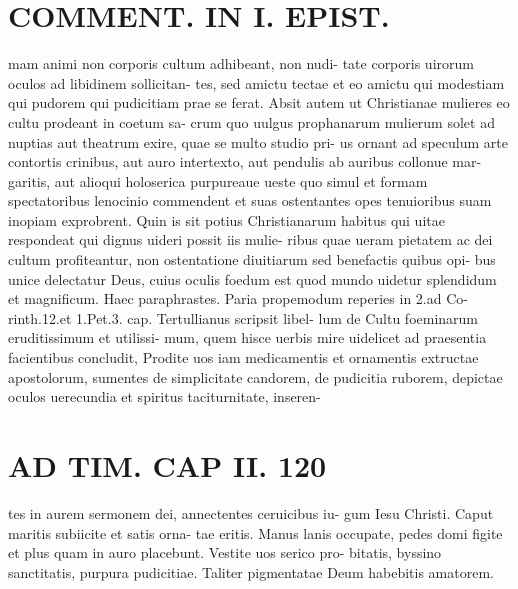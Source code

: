 \documentclass{article}
\begin{document}
\begin{pages}
\section*{COMMENT. IN I. EPIST. }\pstart mam animi non corporis cultum adhibeant, non nudi- tate corporis uirorum oculos ad libidinem sollicitan- tes, sed amictu tectae et eo amictu qui modestiam qui pudorem qui pudicitiam prae se ferat. Absit autem ut Christianae mulieres eo cultu prodeant in coetum sa- crum quo uulgus prophanarum mulierum solet ad nuptias aut theatrum exire, quae se multo studio pri- us ornant ad speculum arte contortis crinibus, aut auro intertexto, aut pendulis ab auribus collonue mar- garitis, aut alioqui holoserica purpureaue ueste quo simul et formam spectatoribus lenocinio commendent et suas ostentantes opes tenuioribus suam inopiam exprobrent. Quin is sit potius Christianarum habitus qui uitae respondeat qui dignus uideri possit iis mulie- ribus quae ueram pietatem ac dei cultum profiteantur, non ostentatione diuitiarum sed benefactis quibus opi- bus unice delectatur Deus, cuius oculis foedum est quod mundo uidetur splendidum et magnificum. Haec paraphrastes. Paria propemodum reperies in 2.ad Co- rinth.12.et 1.Pet.3. cap. Tertullianus scripsit libel- lum de Cultu foeminarum eruditissimum et utilissi- mum, quem hisce uerbis mire uidelicet ad praesentia facientibus concludit, Prodite uos iam medicamentis et ornamentis extructae apostolorum, sumentes de simplicitate candorem, de pudicitia ruborem, depictae oculos uerecundia et spiritus taciturnitate, inseren-  \pend
\section*{AD TIM. CAP II. 120 }\pstart tes in aurem sermonem dei, annectentes ceruicibus iu- gum Iesu Christi. Caput maritis subiicite et satis orna- tae eritis. Manus lanis occupate, pedes domi figite et plus quam in auro placebunt. Vestite uos serico pro- bitatis, byssino sanctitatis, purpura pudicitiae. Taliter pigmentatae Deum habebitis amatorem.  \pend
{}
{}

\end{pages}
\end{document}
